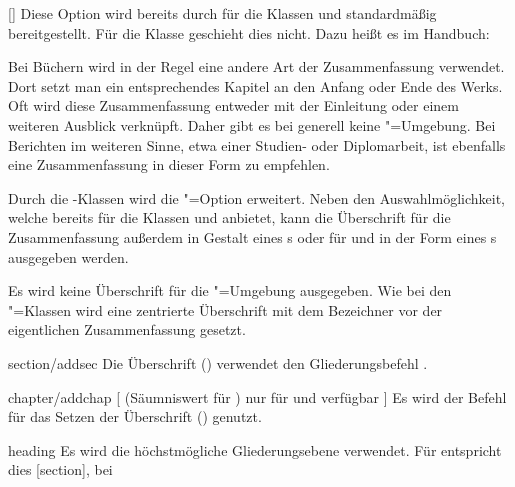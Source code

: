\begin{Declaration}{[\PSet]}%
\printdeclarationlist%
%
%
%
Diese Option wird bereits durch \KOMAScript{} für die Klassen  
und  standardmäßig bereitgestellt. Für die Klasse 
 geschieht dies nicht. Dazu heißt es im Handbuch:
%
\begin{quoting}
Bei Büchern wird in der Regel eine andere Art der Zusammenfassung verwendet. 
Dort setzt man ein entsprechendes Kapitel an den Anfang oder Ende des Werks. 
Oft wird diese Zusammenfassung entweder mit der Einleitung oder einem weiteren 
Ausblick verknüpft. Daher gibt es bei  generell keine 
"=Umgebung. Bei Berichten im weiteren Sinne, etwa einer 
Studien- oder Diplomarbeit, ist ebenfalls eine Zusammenfassung in dieser Form 
zu empfehlen.
\end{quoting}
%
Durch die \TUDScript-Klassen wird die "=Option erweitert. 
Neben den Auswahlmöglichkeit, welche bereits \KOMAScript{} für die Klassen 
 und  anbietet, kann die Überschrift für 
die Zusammenfassung außerdem in Gestalt eines \sectionautorefname{}s oder für 
 und  in der Form eines 
\chapterautorefname{}s ausgegeben werden.
%
\begin{values}
  Es wird keine Überschrift für die "=Umgebung ausgegeben.
  Wie bei den \KOMAScript"=Klassen wird eine zentrierte Überschrift mit dem 
  Bezeichner  vor der eigentlichen Zusammenfassung gesetzt.
\item[section/addsec]
  Die Überschrift () verwendet den Gliederungsbefehl 
  .
\item[chapter/addchap][%
    (Säumniswert für \Class{tudscrbook})
    nur für \Class{tudscrreprt} und \Class{tudscrbook} verfügbar%
  ]
  Es wird der Befehl  für das Setzen der Überschrift 
  () genutzt. 
\item[heading]
  Es wird die höchstmögliche Gliederungsebene verwendet. Für 
   entspricht dies [section], bei 

\end{values}
\end{Declaration}
